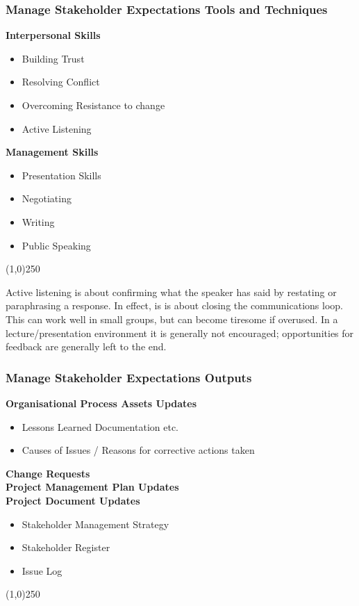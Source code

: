 \begin{frame}
\frametitle{Manage Stakeholder Expectations \hfill\hfill Tools and Techniques}
\textbf{Interpersonal Skills}
\begin{itemize}
	\item Building Trust
	\item Resolving Conflict
	\item Overcoming Resistance to change
	\item Active Listening
\end{itemize}
\textbf{Management Skills}
\begin{itemize}
	\item Presentation Skills
	\item Negotiating 
	\item Writing
	\item Public Speaking
\end{itemize}
\end{frame}\begin{center}\line(1,0){250}\end{center}

Active listening is about confirming what the speaker has said by restating or paraphrasing a response.  In effect, is is about closing the communications loop. This can work well in small groups, but can become tiresome if overused.  In a lecture/presentation environment it is generally not encouraged; opportunities for feedback are generally left to the end.

\begin{frame}
\frametitle{Manage Stakeholder Expectations \hfill\hfill Outputs}
\textbf{Organisational Process Assets Updates}
\begin{itemize}
	\item Lessons Learned Documentation etc.
	\item Causes of Issues / Reasons for corrective actions taken
\end{itemize}
\textbf{Change Requests}\\
\textbf{Project Management Plan Updates}\\
\textbf{Project Document Updates}
\begin{itemize}
	\item Stakeholder Management Strategy
	\item Stakeholder Register
	\item Issue Log
\end{itemize}
\end{frame}\begin{center}\line(1,0){250}\end{center}



